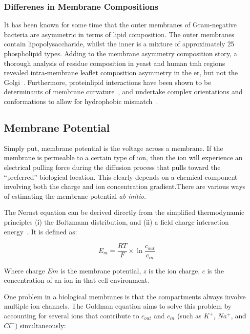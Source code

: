\subsubsection{Differenes in Membrane Compositions}

It has been known for some time that the outer membranes of Gram-negative bacteria are asymmetric in terms of lipid composition. The outer membranes contain lipopolysaccharide, whilst the inner is a mixture of approximately 25 phospholipid types. Adding to the membrane asymmetry composition story, a thorough analysis of residue composition in yeast and human \gls{tmh} regions revealed intra-membrane leaflet composition asymmetry in the \gls{er}, but not the Golgi~\cite{Sharpe2010}. Furthermore, protein\-lipid interactions have been shown to be determinants of membrane curvature~\cite{Jensen2004}, and undertake complex orientations and conformations to allow for hydrophobic mismatch~\cite{Planque2003}. %

\subsection{Membrane Potential}
Simply put, membrane potential is the voltage across a membrane. If the membrane is permeable to a certain type of ion, then the ion will experience an electrical pulling force during the diffusion process that pulls toward the ``preferred'' biological location. This clearly depends on a chemical component involving both the charge and ion concentration gradient.There are various ways of estimating the membrane potential \textit{ ab initio}.

The Nernst equation can be derived directly from the simplified thermodynamic principles (i) the Boltzmann distribution, and (ii) a field charge interaction energy~\cite{Feiner1994}. It is defined as:

\begin{equation}
{E}_{m}=\frac{RT}{F}\times \ln { \frac{{c}_{out}}{{c}_{in}} }
\end{equation}

Where charge $Em$ is the membrane potential, $z$ is the ion charge, $c$ is the concentration of an ion in that cell environment.

One problem in a biological membranes is that the compartments always  involve multiple ion channels. The Goldman equation aims to solve this problem by accounting for several ions that contribute to $c_{out}$ and $c_{in}$ (such as $K^+$, $Na^+$, and $Cl^-$) simultaneously:

